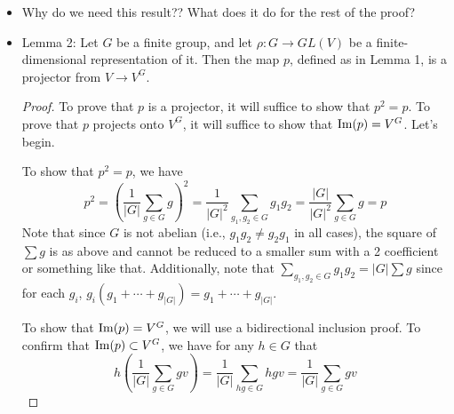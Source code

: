 \documentclass[../notes.tex]{subfiles}
\begin{document}
\begin{itemize}
\begin{proof}
        \begin{align*}
            [p\circ\rho_V(h)](v) &= \frac{1}{|G|}\sum_{g\in G}[\rho_V(g)\circ\rho_V(h)](v)\\
            &= \frac{1}{|G|}\sum_{g\in G}[\rho_V(gh)](v)\\
            &= \frac{1}{|G|}\sum_{gh\in G}[\rho_V(gh)](v)\\
            &= \frac{1}{|G|}\sum_{hg\in G}[\rho_V(hg)](v)\\
            &= \frac{1}{|G|}\sum_{g\in G}[\rho_V(hg)](v)\\
            &= [\rho_V(h)]\left( \frac{1}{|G|}\sum_{g\in G}[\rho_V(g)](v) \right)\\
            &= [\rho_V(h)\circ p](v)
        \end{align*}
    \end{proof}
    \item Why do we need this result?? What does it do for the rest of the proof?
    \item Lemma 2: Let $G$ be a finite group, and let $\rho:G\to GL(V)$ be a finite-dimensional representation of it. Then the map $p$, defined as in Lemma 1, is a projector from $V\to V^G$.
    \begin{proof}
        To prove that $p$ is a projector, it will suffice to show that $p^2=p$. To prove that $p$ projects onto $V^G$, it will suffice to show that $\operatorname{Im}(p)=V^G$. Let's begin.\par
        To show that $p^2=p$, we have
        \begin{equation*}
            p^2 = \left( \frac{1}{|G|}\sum_{g\in G}g \right)^2
            = \frac{1}{|G|^2}\sum_{g_1,g_2\in G}g_1g_2
            = \frac{|G|}{|G|^2}\sum_{g\in G}g
            = p
        \end{equation*}
        Note that since $G$ is not abelian (i.e., $g_1g_2\neq g_2g_1$ in all cases), the square of $\sum g$ is as above and cannot be reduced to a smaller sum with a 2 coefficient or something like that. Additionally, note that $\sum_{g_1,g_2\in G}g_1g_2=|G|\sum g$ since for each $g_i$, $g_i(g_1+\cdots+g_{|G|})=g_1+\cdots+g_{|G|}$.\par
        To show that $\operatorname{Im}(p)=V^G$, we will use a bidirectional inclusion proof. To confirm that $\operatorname{Im}(p)\subset V^G$, we have for any $h\in G$ that
        \begin{equation*}
            h\left( \frac{1}{|G|}\sum_{g\in G}gv \right) = \frac{1}{|G|}\sum_{hg\in G}hgv
            = \frac{1}{|G|}\sum_{g\in G}gv
        \end{equation*}

\end{proof}
\end{itemize}
\end{document}
